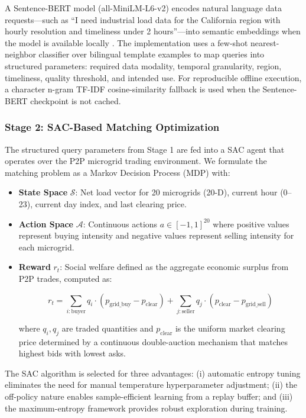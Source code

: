 \documentclass{ieeeaccess}
\begin{document}
A Sentence-BERT model (all-MiniLM-L6-v2) encodes natural language data requests---such as ``I need industrial load data for the California region with hourly resolution and timeliness under 2 hours''---into semantic embeddings when the model is available locally \cite{b31}. The implementation uses a few-shot nearest-neighbor classifier over bilingual template examples to map queries into structured parameters: required data modality, temporal granularity, region, timeliness, quality threshold, and intended use. For reproducible offline execution, a character n-gram TF-IDF cosine-similarity fallback is used when the Sentence-BERT checkpoint is not cached.

\subsubsection{Stage 2: SAC-Based Matching Optimization}

The structured query parameters from Stage 1 are fed into a SAC agent that operates over the P2P microgrid trading environment. We formulate the matching problem as a Markov Decision Process (MDP) with:

\begin{itemize}
  \item \textbf{State Space} $\mathcal{S}$: Net load vector for 20 microgrids (20-D), current hour (0--23), current day index, and last clearing price.
  \item \textbf{Action Space} $\mathcal{A}$: Continuous actions $a \in [-1, 1]^{20}$ where positive values represent buying intensity and negative values represent selling intensity for each microgrid.
  \item \textbf{Reward} $r_t$: Social welfare defined as the aggregate economic surplus from P2P trades, computed as:

  \begin{equation}
  r_t = \sum_{i: \text{buyer}} q_i \cdot (p_{\text{grid\_buy}} - p_{\text{clear}}) + \sum_{j: \text{seller}} q_j \cdot (p_{\text{clear}} - p_{\text{grid\_sell}})
  \label{eq:reward}
  \end{equation}

  where $q_i, q_j$ are traded quantities and $p_{\text{clear}}$ is the uniform market clearing price determined by a continuous double-auction mechanism that matches highest bids with lowest asks.
\end{itemize}

The SAC algorithm is selected for three advantages: (i) automatic entropy tuning eliminates the need for manual temperature hyperparameter adjustment; (ii) the off-policy nature enables sample-efficient learning from a replay buffer; and (iii) the maximum-entropy framework provides robust exploration during training.
\end{document}
